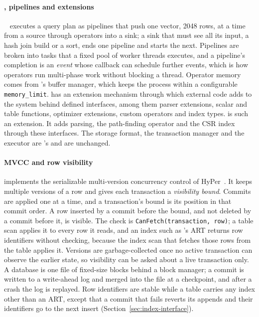 \paragraph{\duckdb, pipelines and extensions} \duckdb~\cite{raasveldt2020duckdb} executes a query plan as pipelines that push one \duckdb
vector, 2048 rows, at a time from a source through operators into a sink; a sink that must see all its input, a hash join build or a
sort, ends one pipeline and starts the next. Pipelines are broken into tasks that a fixed pool of worker threads
executes, and a pipeline's completion is an \emph{event} whose callback can schedule further events, which is how operators run multi-phase work without blocking a thread. Operator memory comes from \duckdb's
buffer manager, which keeps the process within a configurable \texttt{memory\_limit}. \duckdb has an extension mechanism through which external code
adds to the system behind defined interfaces, among them parser extensions, scalar and table functions, optimizer
extensions, custom operators and index types. \duckpgq is such an extension. It adds \sqlpgq parsing, the path-finding operator and the CSR index through these interfaces. The storage
format, the transaction manager and the executor are \duckdb's and are unchanged.

\paragraph{MVCC and row visibility} \duckdb implements the serializable multi-version concurrency control of HyPer~\cite{neumann2015mvcc,duckdb2019}.
It keeps multiple versions of a row and gives each transaction a \emph{visibility bound}. Commits are applied one
at a time, and a transaction's bound is its position in that commit order. A row inserted by a commit before the bound, and not deleted by a commit before it, is
visible. The check is \texttt{CanFetch(transaction, row)}; a table scan applies it to every row it reads, and
an index such as \duckdb's ART returns row identifiers without checking, because the index scan that fetches those rows from the table applies it. Versions are garbage-collected once no active transaction can observe the earlier state, so
visibility can be asked about a live transaction only. A database is one file of fixed-size blocks behind a block manager; a commit is written to a write-ahead log and
merged into the file at a checkpoint, and after a crash the log is replayed. Row identifiers are stable while a table carries any index
other than an ART, except that a commit that fails reverts its appends and their identifiers go to the next insert
(Section~\ref{sec:index-interface}).

